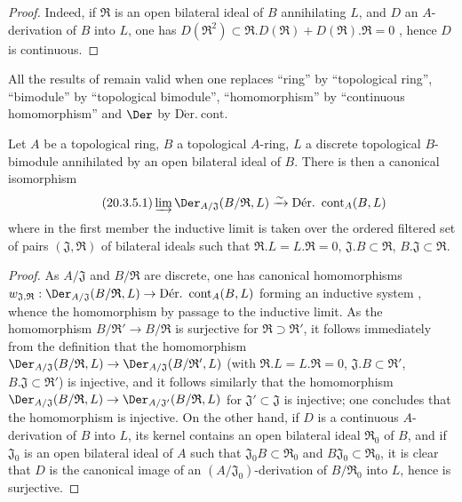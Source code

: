 \begin{proof}
Indeed, if $\mathfrak{R}$ is an open bilateral ideal of $B$ annihilating $L$, and $D$ an $A$-derivation of $B$ into $L$, one has $D(\mathfrak{R}^2)\subset\mathfrak{R}.D(\mathfrak{R})+D(\mathfrak{R}).\mathfrak{R}=0$ , hence $D$ is continuous.
\end{proof}

\begin{env}[20.3.4]
\label{0.20.3.4}
All the results of  remain valid when one replaces ``ring'' by ``topological ring'', ``bimodule'' by ``topological bimodule'', ``homomorphism'' by ``continuous homomorphism'' and $\Der$ by $\operatorname{D\acute{e}r.\ cont}$.
\end{env}

\begin{proposition}[20.3.5]
\label{0.20.3.5}
Let $A$ be a topological ring, $B$ a topological $A$-ring, $L$ a discrete topological $B$-bimodule annihilated by an open bilateral ideal of $B$.
There is then a canonical isomorphism
\begin{equation}
\tag{20.3.5.1}
  \label{0.20.3.5.1}
  \varinjlim\Der_{A/\mathfrak{J}}(B/\mathfrak{R},L)\xrightarrow{\sim}\operatorname{D\acute{e}r.\ cont}_A(B,L)
\end{equation}
where in the first member the inductive limit is taken over the ordered filtered set of pairs $(\mathfrak{J},\mathfrak{R})$ of bilateral ideals such that $\mathfrak{R}.L=L.\mathfrak{R}=0$, $\mathfrak{J}.B\subset\mathfrak{R}$, $B.\mathfrak{J}\subset\mathfrak{R}$.
\end{proposition}

\begin{proof}
As $A/\mathfrak{J}$ and $B/\mathfrak{R}$ are discrete, one has canonical homomorphisms $w_{\mathfrak{J},\mathfrak{R}}:\Der_{A/\mathfrak{J}}(B/\mathfrak{R},L)\to\operatorname{D\acute{e}r.\ cont}_A(B,L)$ forming an inductive system , whence the homomorphism  by passage to the inductive limit.
As the homomorphism $B/\mathfrak{R}'\to B/\mathfrak{R}$ is surjective for $\mathfrak{R}\supset\mathfrak{R}'$, it follows immediately from the definition that the homomorphism $\Der_{A/\mathfrak{J}}(B/\mathfrak{R},L)\to\Der_{A/\mathfrak{J}}(B/\mathfrak{R}',L)$ (with $\mathfrak{R}.L=L.\mathfrak{R}=0$, $\mathfrak{J}.B\subset\mathfrak{R}'$, $B.\mathfrak{J}\subset\mathfrak{R}'$) is injective, and it follows similarly that the homomorphism $\Der_{A/\mathfrak{J}}(B/\mathfrak{R},L)\to\Der_{A/\mathfrak{J}'}(B/\mathfrak{R},L)$ for $\mathfrak{J}'\subset\mathfrak{J}$  is injective; one concludes that the homomorphism  is injective.
On the other hand, if $D$ is a continuous $A$-derivation of $B$ into $L$, its kernel contains an open bilateral ideal $\mathfrak{R}_0$ of $B$, and if $\mathfrak{J}_0$ is an open bilateral ideal of $A$ such that $\mathfrak{J}_0 B\subset\mathfrak{R}_0$ and $B\mathfrak{J}_0\subset\mathfrak{R}_0$, it is clear that $D$ is the canonical image of an $(A/\mathfrak{J}_0)$-derivation of $B/\mathfrak{R}_0$ into $L$, hence  is surjective.
\end{proof}

